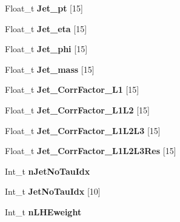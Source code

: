\begin{DoxyCompactItemize}
\item 
\hypertarget{classMiniTree_a2c7dfe5a1a4d5a4af3d84d2d570f1807}{}\label{classMiniTree_a2c7dfe5a1a4d5a4af3d84d2d570f1807} 
Float\+\_\+t {\bfseries Jet\+\_\+pt} \mbox{[}15\mbox{]}
\item 
\hypertarget{classMiniTree_a7138828c089bfded2e95cf5c0f668790}{}\label{classMiniTree_a7138828c089bfded2e95cf5c0f668790} 
Float\+\_\+t {\bfseries Jet\+\_\+eta} \mbox{[}15\mbox{]}
\item 
\hypertarget{classMiniTree_ab8f2ca8897a65675f2e993ada1ade6a5}{}\label{classMiniTree_ab8f2ca8897a65675f2e993ada1ade6a5} 
Float\+\_\+t {\bfseries Jet\+\_\+phi} \mbox{[}15\mbox{]}
\item 
\hypertarget{classMiniTree_a003f05e992446889a5248aab68a53ae5}{}\label{classMiniTree_a003f05e992446889a5248aab68a53ae5} 
Float\+\_\+t {\bfseries Jet\+\_\+mass} \mbox{[}15\mbox{]}
\item 
\hypertarget{classMiniTree_a155438da647ffac7f71ec995a1dc1948}{}\label{classMiniTree_a155438da647ffac7f71ec995a1dc1948} 
Float\+\_\+t {\bfseries Jet\+\_\+\+Corr\+Factor\+\_\+\+L1} \mbox{[}15\mbox{]}
\item 
\hypertarget{classMiniTree_a32d031ecf12dd16f20f4d940ff593db6}{}\label{classMiniTree_a32d031ecf12dd16f20f4d940ff593db6} 
Float\+\_\+t {\bfseries Jet\+\_\+\+Corr\+Factor\+\_\+\+L1\+L2} \mbox{[}15\mbox{]}
\item 
\hypertarget{classMiniTree_abbd96547e47b2e6ceb4d8ff7dfffe4d0}{}\label{classMiniTree_abbd96547e47b2e6ceb4d8ff7dfffe4d0} 
Float\+\_\+t {\bfseries Jet\+\_\+\+Corr\+Factor\+\_\+\+L1\+L2\+L3} \mbox{[}15\mbox{]}
\item 
\hypertarget{classMiniTree_a294dd2094286b58c16cfd938a29e27e7}{}\label{classMiniTree_a294dd2094286b58c16cfd938a29e27e7} 
Float\+\_\+t {\bfseries Jet\+\_\+\+Corr\+Factor\+\_\+\+L1\+L2\+L3\+Res} \mbox{[}15\mbox{]}
\item 
\hypertarget{classMiniTree_ab6791aac30662be684d8f8ec9b75e5a7}{}\label{classMiniTree_ab6791aac30662be684d8f8ec9b75e5a7} 
Int\+\_\+t {\bfseries n\+Jet\+No\+Tau\+Idx}
\item 
\hypertarget{classMiniTree_a89beb7f0dbd86e8ede92d5bf900141bd}{}\label{classMiniTree_a89beb7f0dbd86e8ede92d5bf900141bd} 
Int\+\_\+t {\bfseries Jet\+No\+Tau\+Idx} \mbox{[}10\mbox{]}
\item 
\hypertarget{classMiniTree_aa188184ab68c3a8b7ee7440391224e6a}{}\label{classMiniTree_aa188184ab68c3a8b7ee7440391224e6a} 
Int\+\_\+t {\bfseries n\+L\+H\+Eweight}
\item 
\hypertarget{classMiniTree_a1d92e8545aa8bf8eb1b3b9f7c11c08ce}{}\label{classMiniTree_a1d92e8545aa8bf8eb1b3b9f7c11c08ce} 

\end{DoxyCompactItemize}

